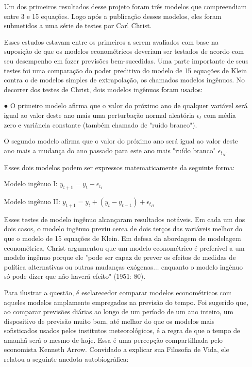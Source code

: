\documentclass[12pt]{article}
\begin{document}
Um dos primeiros resultados desse projeto foram três modelos que compreendiam entre 3 e 15 equações. Logo após a publicação desses modelos, eles foram submetidos a uma série de testes por Carl Christ.

Esses estudos estavam entre os primeiros a serem avaliados com base na suposição de que os modelos econométricos deveriam ser testados de acordo com seu desempenho em fazer previsões bem-sucedidas. Uma parte importante de seus testes foi uma comparação do poder preditivo do modelo de 15 equações de Klein contra o de modelos simples de extrapolação, os chamados modelos ingênuos.
No decorrer dos testes de Christ, dois modelos ingênuos foram usados:

● O primeiro modelo afirma que o valor do próximo ano de qualquer variável será igual ao valor deste ano mais uma perturbação normal aleatória \( \epsilon_t \) com média zero e variância constante (também chamado de "ruído branco").

O segundo modelo afirma que o valor do próximo ano será igual ao valor deste ano mais a mudança do ano passado para este ano mais "ruído branco" \( \epsilon_{t_{II}} \).

Esses dois modelos podem ser expressos matematicamente da seguinte forma:

Modelo ingênuo I: \( y_{t+1} = y_t + \epsilon_{t_{I}} \)

Modelo ingênuo II: \( y_{t+1} = y_t + (y_t - y_{t-1}) + \epsilon_{t_{II}} \)

Esses testes de modelo ingênuo alcançaram resultados notáveis. Em cada um dos dois casos, o modelo ingênuo previu cerca de dois terços das variáveis melhor do que o modelo de 15 equações de Klein. Em defesa da abordagem de modelagem econométrica, Christ argumentou que um modelo econométrico é preferível a um modelo ingênuo porque ele "pode ser capaz de prever os efeitos de medidas de política alternativas ou outras mudanças exógenas... enquanto o modelo ingênuo só pode dizer que não haverá efeito" (1951: 80).

Para ilustrar a questão, é esclarecedor comparar modelos econométricos com aqueles modelos amplamente empregados na previsão do tempo. Foi sugerido que, ao comparar previsões diárias ao longo de um período de um ano inteiro, um dispositivo de previsão muito bom, até melhor do que os modelos mais sofisticados usados pelos institutos meteorológicos, é a regra de que o tempo de amanhã será o mesmo de hoje. Essa é uma percepção compartilhada pelo economista Kenneth Arrow. Convidado a explicar sua Filosofia de Vida, ele relatou a seguinte anedota autobiográfica:
\end{document}
